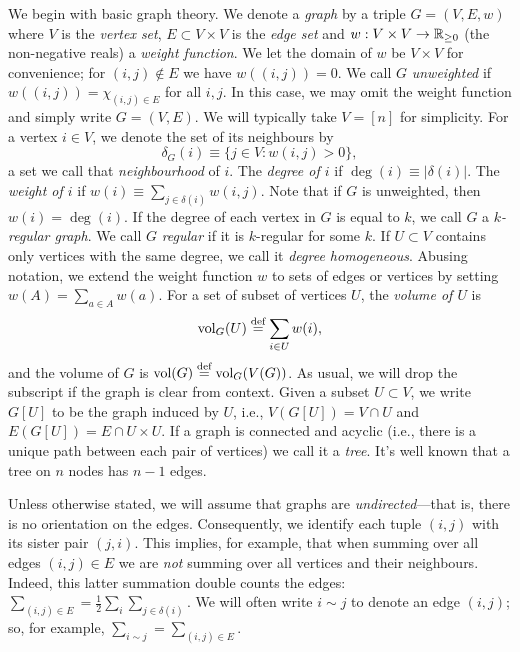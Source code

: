 We begin with basic graph theory. 
We denote a \emph{graph} by a triple $G=(V,E,w)$ where $V$ is the \emph{vertex set}, $E\subset V\times V$ is the \emph{edge set} and $w:V\times V\to\mathbb{R}_{\geq0}$ (the non-negative reals) a \emph{weight function}. We let the domain of $w$ be $V\times V$ for convenience; for $(i,j)\notin E$ we have $w((i,j))=0$. We call $G$ \emph{unweighted} if $w((i,j))=\chi_{(i,j)\in E}$ for all $i,j$. In this case, we may omit the weight function and simply write $G=(V,E)$. 
We will typically take $V=[n]$ for simplicity. For a  vertex $i\in V$, we denote the set of its neighbours by 
\begin{equation}
\label{eq:delta(i)}
\delta_G(i) \equiv  \{j\in V:w(i,j)>0\},
\end{equation}
a set we call that \emph{neighbourhood} of $i$. The \emph{degree of $i$} if $\deg(i)\equiv |\delta(i)|$. The \emph{weight of $i$} if $w(i)\equiv \sum_{j\in \delta(i)}w(i,j)$. Note that if $G$ is unweighted, then $w(i)=\deg(i)$. If the degree of each vertex in $G$ is equal to $k$, we call $G$ a \emph{$k$-regular graph}. We call $G$ \emph{regular} if it is $k$-regular for some $k$. If $U\subset V$ contains only vertices with the same degree, we call it \emph{degree homogeneous}. 
Abusing notation, we extend the weight function $w$ to sets of edges or vertices by setting $w(A)=\sum_{a\in A}w(a)$. 
For a set of subset of vertices $U$, the \emph{volume of $U$} is 
\begin{equation}
\label{eq:volU}
\textnormal{vol}_G(U) \overset{\text{def}}{=} \sum_{i\in U}w(i),
\end{equation}
and the volume of $G$ is $\textnormal{vol}(G) \overset{\text{def}}{=} \textnormal{vol}_G(V(G))$. As usual, we will drop the subscript if the graph is clear from context. Given a subset $U\subset  V$, we write $G[U]$ to be the graph induced by $U$, i.e., $V(G[U])  = V\cap U$ and  $E(G[U]) = E \cap U \times U$. If a graph is connected  and acyclic (i.e., there is a unique path between each pair of vertices) we call it a \emph{tree}. It's well known that a tree on $n$ nodes has $n-1$ edges.  

Unless otherwise stated, we will assume that graphs are \emph{undirected}---that is, there is no orientation on the edges. Consequently, we identify each tuple $(i,j)$ with its sister pair $(j,i)$. This implies, for example, that when summing over all edges $(i,j)\in E$ we are \emph{not} summing over all vertices and their neighbours. Indeed, this latter summation double counts the edges: $\sum_{(i,j)\in E}=\frac{1}{2}\sum_{i}\sum_{j\in\delta(i)}$. We will often write $i\sim j$ to denote an edge $(i,j)$; so, for example, $\sum_{i\sim j}=\sum_{(i,j)\in E}$. 

